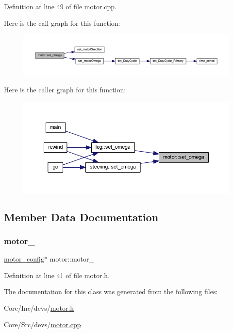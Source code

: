 Definition at line 49 of file motor.\+cpp.

Here is the call graph for this function\+:
\nopagebreak
\begin{figure}[H]
\begin{center}
\leavevmode
\includegraphics[width=350pt]{classmotor_aafd4845142b5d311ea73331b3ae1bb33_cgraph}
\end{center}
\end{figure}
Here is the caller graph for this function\+:
\nopagebreak
\begin{figure}[H]
\begin{center}
\leavevmode
\includegraphics[width=350pt]{classmotor_aafd4845142b5d311ea73331b3ae1bb33_icgraph}
\end{center}
\end{figure}


\subsection{Member Data Documentation}
\mbox{\label{classmotor_ab02539b935506b27e47fe9ae15213ea7}} 
\subsubsection{\texorpdfstring{motor\_}{motor\_}}
{\footnotesize\ttfamily \mbox{\hyperlink{structmotor__config}{motor\+\_\+config}}$\ast$ motor\+::motor\+\_\+\hspace{0.3cm}{\ttfamily [private]}}



Definition at line 41 of file motor.\+h.



The documentation for this class was generated from the following files\+:\begin{DoxyCompactItemize}
\item 
Core/\+Inc/devs/\mbox{\hyperlink{motor_8h}{motor.\+h}}\item 
Core/\+Src/devs/\mbox{\hyperlink{motor_8cpp}{motor.\+cpp}}\end{DoxyCompactItemize}
